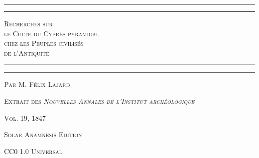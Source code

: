 \documentclass[a4paper, 11pt, oneside, polutonikogreek, french]{article}
\begin{document}
\begin{titlepage} %
	\centering %

	
	\rule{\textwidth}{1.6pt}\vspace*{-\baselineskip}\vspace*{2pt} %
	\rule{\textwidth}{0.4pt} %
	
	{\scshape\LARGE Recherches sur \\ le Culte du Cyprès pyramidal\\ chez les Peuples civilisés \\ de l'Antiquité}
	
	\rule{\textwidth}{0.4pt}\vspace*{-\baselineskip}\vspace{3.2pt} %
	\rule{\textwidth}{1.6pt} %

	
	\vspace{1\baselineskip}
	
	{\scshape Par \Large M. Félix Lajard} %
	
    
	
	
    \vspace*{\fill}

	\vspace{1\baselineskip}

	{\small\scshape Extrait des \emph{Nouvelles Annales de l'Institut archéologique}}
	
	{\small\scshape{Vol. 19, 1847}}
	
	\vspace{0.5\baselineskip} %

    \scshape Solar Anamnesis Edition  %
	
	{\scshape\small CC0 1.0 Universal} %
\end{titlepage}
\setlength{\parskip}{1mm plus1mm minus1mm}
\setcounter{tocdepth}{3}
\setcounter{secnumdepth}{3}
\tableofcontents
\clearpage
\listoffigures
\clearpage
\end{document}
